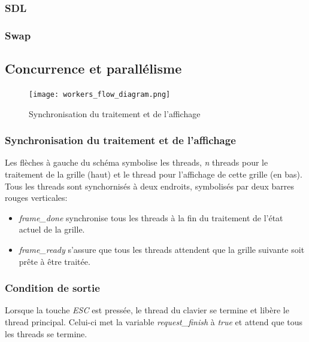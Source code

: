 \documentclass[11pt, a4paper]{article}
\begin{document}
\subsubsection{SDL}

\subsubsection{Swap}

\newpage

\subsection{Concurrence et parallélisme}

\begin{figure}[H]
	\begin{center}
		\texttt{[image: workers\_flow\_diagram.png]}
	\end{center}
	\caption{Synchronisation du traitement et de l'affichage}
	\label{Synchronisation du traitement et de l'affichage}
\end{figure}

\subsubsection{Synchronisation du traitement et de l'affichage}

Les flèches à gauche du schéma symbolise les threads, \textit{n} threads pour le traitement de la grille (haut) et le thread pour l'affichage de cette grille (en bas). \\

Tous les threads sont synchornisés à deux endroits, symbolisés par deux barres rouges verticales:
\begin{itemize}
	\item \textit{frame\_done} synchronise tous les threads à la fin du traitement de l'état actuel de la grille.
	\item \textit{frame\_ready} s'assure que tous les threads attendent que la grille suivante soit prête à être traitée.
\end{itemize}

\subsubsection{Condition de sortie}

Lorsque la touche \textit{ESC} est pressée, le thread du clavier se termine et libère le thread principal. Celui-ci met la variable \textit{request\_finish} à \textit{true} et attend que tous les threads se termine. \\
\end{document}
